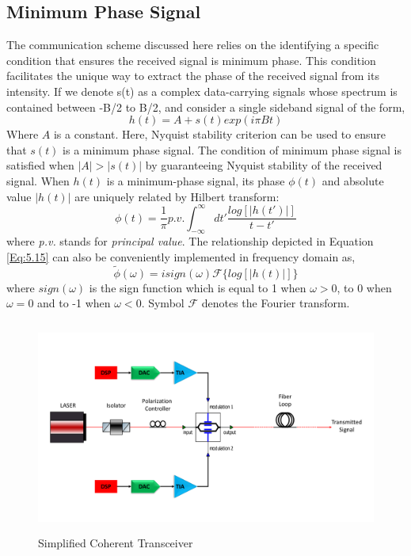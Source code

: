 \subsection{Minimum Phase Signal}
The communication scheme discussed here relies on the identifying a specific condition that ensures the received signal is minimum phase. This condition facilitates the unique way to extract the phase of the received signal from its intensity. If we denote s(t) as a complex data-carrying signals whose spectrum is contained between -B/2 to B/2, and consider a single sideband signal of the form,
\begin{equation}
h(t)=A+s(t)exp(i\pi Bt)
\end{equation}
Where $A$ is a constant. Here, Nyquist stability criterion can be used to ensure that $s(t)$ is a minimum phase signal. The condition of minimum phase signal is satisfied when $|A|>|s(t)|$ by guaranteeing Nyquist stability of the received signal.
When $h(t)$ is a minimum-phase signal, its phase $\phi(t)$ and absolute value $|h(t)|$ are uniquely related by Hilbert transform:
\begin{equation}
	\phi(t)=\frac{1}{\pi}  p.v. \int_{-\infty}^{\infty} dt' \frac{log[|h(t')|]}{t-t'}
	\label{Eq:5.15}
\end{equation}
where \textit{p.v.} stands for \textit{principal value}. The relationship depicted in Equation \ref{Eq:5.15} can also be conveniently implemented in frequency domain as,
\begin{equation}
\tilde{\phi}(\omega)=i sign(\omega) \mathcal{F} \{log[|h(t)|]\}
\end{equation}
where $sign(\omega)$ is the sign function which is equal to 1 when $\omega>0$, to 0 when $\omega=0$ and to -1 when $\omega<0$. Symbol $\mathcal{F}$ denotes the Fourier transform.
\begin{figure}[h]
	\centering
	\includegraphics[width=1.0\textwidth, height=7cm]{./sdf/simplified_coherent_receiver/figures/Single_Polarization_Tx.pdf}
	\caption{Simplified Coherent Transceiver}\label{simplified_coherent_transceiver}
\end{figure}

